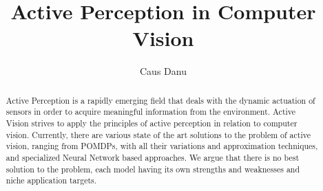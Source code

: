 \documentclass[a4paper,11pt,english]{article}
\begin{document}
\title{Active Perception in Computer Vision}
\author{Caus Danu}
	
\maketitle 
\begin{abstract}
	Active Perception is a rapidly emerging field that deals with the dynamic actuation of sensors in order to acquire meaningful information from the environment. Active Vision strives to apply the principles of active perception in relation to computer vision. Currently, there are various state of the art solutions to the problem of active vision, ranging from POMDPs, with all their variations and approximation techniques, and specialized Neural Network based approaches. We argue that there is no best solution to the problem, each model having its own strengths and weaknesses and niche application targets.
\end{abstract}
\end{document}
